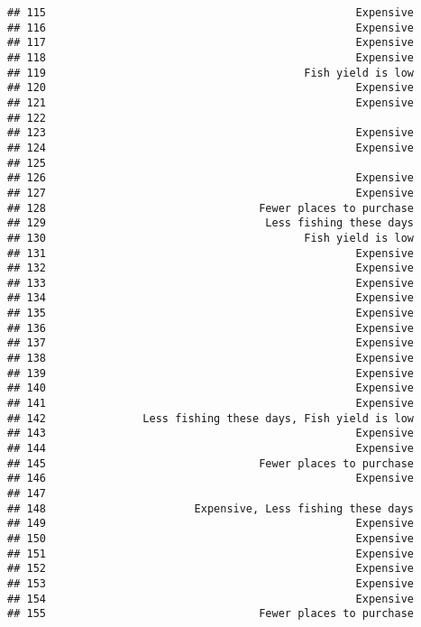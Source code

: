 \documentclass[
]{article}
\begin{document}
\begin{verbatim}
## 115                                                Expensive
## 116                                                Expensive
## 117                                                Expensive
## 118                                                Expensive
## 119                                        Fish yield is low
## 120                                                Expensive
## 121                                                Expensive
## 122                                                         
## 123                                                Expensive
## 124                                                Expensive
## 125                                                         
## 126                                                Expensive
## 127                                                Expensive
## 128                                 Fewer places to purchase
## 129                                  Less fishing these days
## 130                                        Fish yield is low
## 131                                                Expensive
## 132                                                Expensive
## 133                                                Expensive
## 134                                                Expensive
## 135                                                Expensive
## 136                                                Expensive
## 137                                                Expensive
## 138                                                Expensive
## 139                                                Expensive
## 140                                                Expensive
## 141                                                Expensive
## 142               Less fishing these days, Fish yield is low
## 143                                                Expensive
## 144                                                Expensive
## 145                                 Fewer places to purchase
## 146                                                Expensive
## 147                                                         
## 148                       Expensive, Less fishing these days
## 149                                                Expensive
## 150                                                Expensive
## 151                                                Expensive
## 152                                                Expensive
## 153                                                Expensive
## 154                                                Expensive
## 155                                 Fewer places to purchase

\end{verbatim}
\end{document}
